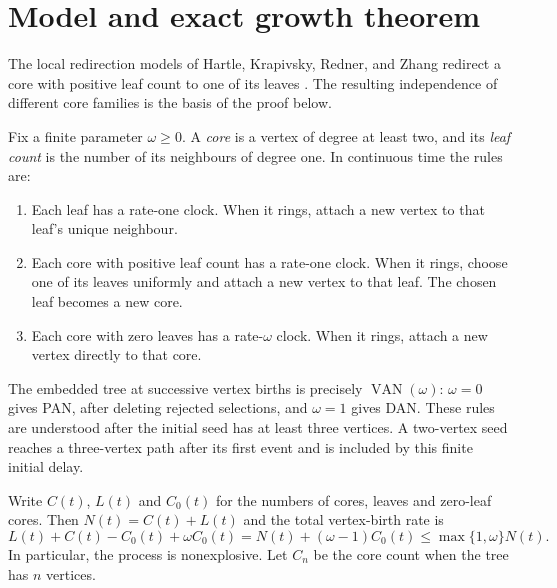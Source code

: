 \section{Model and exact growth theorem}
\label{van:section}

The local redirection models of Hartle, Krapivsky, Redner, and Zhang
redirect a core with positive leaf count to one of its leaves
\cite{HRKZ2026}. The resulting independence of different core families
is the basis of the proof below.

Fix a finite parameter $\omega\ge0$.  A \emph{core} is a vertex of degree
at least two, and its \emph{leaf count} is the number of its neighbours
of degree one.  In continuous time the rules are:
\begin{enumerate}
\item Each leaf has a rate-one clock.  When it rings, attach a new vertex
to that leaf's unique neighbour.
\item Each core with positive leaf count has a rate-one clock.  When it
rings, choose one of its leaves uniformly and attach a new vertex to
that leaf.  The chosen leaf becomes a new core.
\item Each core with zero leaves has a rate-$\omega$ clock.  When it
rings, attach a new vertex directly to that core.
\end{enumerate}
The embedded tree at successive vertex births is precisely
$\operatorname{VAN}(\omega)$: $\omega=0$ gives PAN, after deleting
rejected selections, and $\omega=1$ gives DAN.  These rules are understood
after the initial seed has at least three vertices.  A two-vertex seed
reaches a three-vertex path after its first event and is included by
this finite initial delay.

Write $C(t)$, $L(t)$ and $C_0(t)$ for the numbers of cores, leaves and
zero-leaf cores.  Then $N(t)=C(t)+L(t)$ and the total vertex-birth rate is
\[
 L(t)+C(t)-C_0(t)+\omega C_0(t)
 =N(t)+(\omega-1)C_0(t)\le \max\{1,\omega\}N(t).
\]
In particular, the process is nonexplosive.  Let $C_n$ be the core count
when the tree has $n$ vertices.

